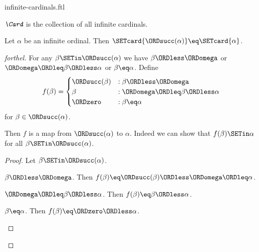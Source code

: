 \documentclass{naproche-library}
\begin{document}
\begin{smodule}[title=Infinite Cardinal Numbers]{infinite-cardinals.ftl}

\begin{definition}[forthel,id=SET_THEORY_07_4231078585827328]
  $\emph{\Card}$ is the collection of all infinite cardinals.
\end{definition}

\begin{proposition}[forthel,id=SET_THEORY_07_8189062544359424]
  Let $\alpha$ be an infinite ordinal.
  Then $\SETcard{\ORDsucc(\alpha)} \eq \SETcard{\alpha}$.
\end{proposition}
\begin{proof}[forthel]
  For any $\beta \SETin \ORDsucc(\alpha)$ we have
  $\beta \ORDless \ORDomega$ or $\ORDomega \ORDleq \beta \ORDless \alpha$ or $\beta \eq \alpha$.
  Define \[ f(\beta) =
    \begin{cases}
      \ORDsucc(\beta)  & : \beta \ORDless \ORDomega
      \\
      \beta         & : \ORDomega \ORDleq \beta \ORDless \alpha
      \\
      \ORDzero             & : \beta \eq \alpha
    \end{cases} \]
  for $\beta \in \ORDsucc(\alpha)$.

  Then $f$ is a map from $\ORDsucc(\alpha)$ to $\alpha$.
  Indeed we can show that $f(\beta) \SETin \alpha$ for all
  $\beta \SETin \ORDsucc(\alpha)$.
  \begin{proof}
    Let $\beta \SETin \ORDsucc(\alpha)$.

    \begin{case}{$\beta \ORDless \ORDomega$.}
      Then $f(\beta)
        \eq \ORDsucc(\beta)
        \ORDless \ORDomega
        \ORDleq \alpha$.
    \end{case}

    \begin{case}{$\ORDomega \ORDleq \beta \ORDless \alpha$.}
      Then $f(\beta)
        \eq \beta
        \ORDless \alpha$.
    \end{case}

    \begin{case}{$\beta \eq \alpha$.}
      Then $f(\beta)
        \eq \ORDzero
        \ORDless \alpha$.
    \end{case}
  \end{proof}


\end{proof}
\end{smodule}
\end{document}
